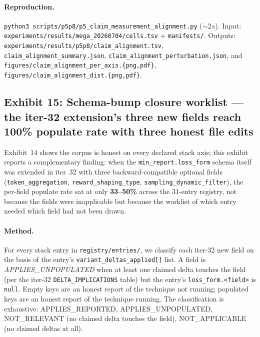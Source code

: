 \paragraph{Reproduction.}
\texttt{python3 scripts/p5p8/p5\_claim\_measurement\_alignment.py}
($\sim$2\,s). Input: \texttt{experiments/results/mega\_20260704/cells.tsv}
$+$ \texttt{manifests/}. Outputs:
\texttt{experiments/results/p5p8/claim\_alignment.tsv},
\texttt{claim\_alignment\_summary.json},
\texttt{claim\_alignment\_perturbation.json}, and
\texttt{figures/claim\_alignment\_per\_axis.\{png,pdf\}},
\texttt{figures/claim\_alignment\_dist.\{png,pdf\}}.

\subsection{Exhibit 15: Schema-bump closure worklist --- the
iter-32 extension's three new fields reach 100\% populate rate
with three honest file edits}
\label{sec:p5-exhibit-schema-bump}

Exhibit~14 shows the corpus is honest on every declared stack axis;
this exhibit reports a complementary finding: when the
\texttt{min\_report.loss\_form} schema itself was extended in
iter~32 with three backward-compatible optional fields
(\texttt{token\_aggregation}, \texttt{reward\_shaping\_type},
\texttt{sampling\_dynamic\_filter}), the per-field populate rate sat
at only \textbf{33--50\%} across the 31-entry registry, not because
the fields were inapplicable but because the worklist of which
entry needed which field had not been drawn.

\paragraph{Method.}
For every stack entry in \texttt{registry/entries/}, we classify
each iter-32 new field on the basis of the entry's
\texttt{variant\_deltas\_applied[]} list. A field is
\emph{APPLIES\_UNPOPULATED} when at least one claimed delta touches
the field (per the iter-32 \texttt{DELTA\_IMPLICATIONS} table) but
the entry's \texttt{loss\_form.<field>} is \texttt{null}. Empty
keys are an honest report of the technique not running; populated
keys are an honest report of the technique running. The
classification is exhaustive: APPLIES\_REPORTED,
APPLIES\_UNPOPULATED, NOT\_RELEVANT (no claimed delta touches the
field), NOT\_APPLICABLE (no claimed deltas at all).

